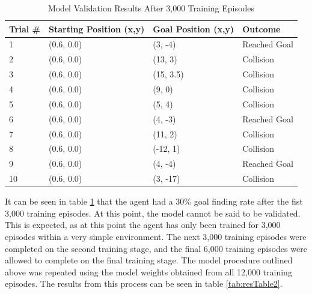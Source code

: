 \documentclass[conference]{IEEEtran}
\begin{document}
\begin{table}[h!]
\begin{tabular}{|l|l|l|l|}
\hline
\textbf{Trial \#} & \textbf{Starting Position (x,y)} & \textbf{Goal Position (x,y)} & \textbf{Outcome} \\ \hline
1                 & (0.6, 0.0)                       & (3, -4)                      & Reached Goal     \\ \hline
2                 & (0.6, 0.0)                       & (13, 3)                      & Collision        \\ \hline
3                 & (0.6, 0.0)                       & (15, 3.5)                    & Collision        \\ \hline
4                 & (0.6, 0.0)                       & (9, 0)                       & Collision        \\ \hline
5                 & (0.6, 0.0)                       & (5, 4)                       & Collision        \\ \hline
6                 & (0.6, 0.0)                       & (4, -3)                      & Reached Goal     \\ \hline
7                 & (0.6, 0.0)                       & (11, 2)                      & Collision        \\ \hline
8                 & (0.6, 0.0)                       & (-12, 1)                     & Collision        \\ \hline
9                 & (0.6, 0.0)                       & (4, -4)                      & Reached Goal     \\ \hline
10                & (0.6, 0.0)                       & (3, -17)                     & Collision        \\ \hline
\end{tabular}
\caption{Model Validation Results After 3,000 Training Episodes}
\label{tab:resTable1}
\end{table}

It can be seen in table \ref{tab:resTable1} that the agent had a 30\% goal finding rate after the fist 3,000 training episodes. At this point, the model cannot be said to be validated. This is expected, as at this point the agent has only been trained for 3,000 episodes within a very simple environment. The next 3,000 training episodes were completed on the second training stage, and the final 6,000 training episodes were allowed to complete on the final training stage. The model procedure outlined above was repeated using the model weights obtained from all 12,000 training episodes. The results from this process can be seen in table \ref{tab:resTable2}.
\end{document}
